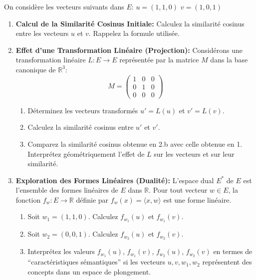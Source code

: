 \documentclass[11pt,a4paper]{report}
\begin{document}
On considère les vecteurs suivants dans \(E\): \(u = (1, 1, 0)\)
\(v = (1, 0, 1)\)

\begin{enumerate}
\def\labelenumi{\arabic{enumi}.}
\item
  \textbf{Calcul de la Similarité Cosinus Initiale:} Calculez la
  similarité cosinus entre les vecteurs \(u\) et \(v\). Rappelez la
  formule utilisée.
\item
  \textbf{Effet d'une Transformation Linéaire (Projection):} Considérons
  une transformation linéaire \(L: E \to E\) représentée par la matrice
  \(M\) dans la base canonique de \(\mathbb{R}^3\):
  \[M = \begin{pmatrix} 1 & 0 & 0 \\ 0 & 1 & 0 \\ 0 & 0 & 0 \end{pmatrix}\]

  \begin{enumerate}
  \def\labelenumii{\alph{enumii}.}

  \item
    Déterminez les vecteurs transformés \(u' = L(u)\) et \(v' = L(v)\).
  \item
    Calculez la similarité cosinus entre \(u'\) et \(v'\).
  \item
    Comparez la similarité cosinus obtenue en 2.b avec celle obtenue en
    1. Interprétez géométriquement l'effet de \(L\) sur les vecteurs et
    sur leur similarité.
  \end{enumerate}
\item
  \textbf{Exploration des Formes Linéaires (Dualité):} L'espace dual
  \(E^*\) de \(E\) est l'ensemble des formes linéaires de \(E\) dans
  \(\mathbb{R}\). Pour tout vecteur \(w \in E\), la fonction
  \(f_w: E \to \mathbb{R}\) définie par
  \(f_w(x) = \langle x, w \rangle\) est une forme linéaire.

  \begin{enumerate}
  \def\labelenumii{\alph{enumii}.}

  \item
    Soit \(w_1 = (1, 1, 0)\). Calculez \(f_{w_1}(u)\) et \(f_{w_1}(v)\).
  \item
    Soit \(w_2 = (0, 0, 1)\). Calculez \(f_{w_2}(u)\) et \(f_{w_2}(v)\).
  \item
    Interprétez les valeurs \(f_{w_1}(u)\), \(f_{w_1}(v)\),
    \(f_{w_2}(u)\), \(f_{w_2}(v)\) en termes de ``caractéristiques
    sémantiques'' si les vecteurs \(u, v, w_1, w_2\) représentent des
    concepts dans un espace de plongement.
  \end{enumerate}
\end{enumerate}
\end{document}
